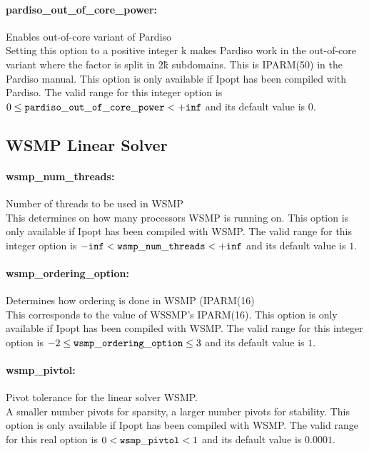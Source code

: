 \paragraph{pardiso\_out\_of\_core\_power:}\label{opt:pardiso_out_of_core_power} Enables out-of-core variant of Pardiso \\
 Setting this option to a positive integer k makes
Pardiso work in the out-of-core variant where the
factor is split in 2\^k subdomains.  This is
IPARM(50) in the Pardiso manual.  This option is
only available if Ipopt has been compiled with
Pardiso. The valid range for this integer option is
$0 \le {\tt pardiso\_out\_of\_core\_power } <  {\tt +inf}$
and its default value is $0$.


\subsection{WSMP Linear Solver}

\paragraph{wsmp\_num\_threads:}\label{opt:wsmp_num_threads} Number of threads to be used in WSMP  \\
 This determines on how many processors WSMP is
running on.  This option is only available if
Ipopt has been compiled with WSMP. The valid range for this integer option is
${\tt -inf} <  {\tt wsmp\_num\_threads } <  {\tt +inf}$
and its default value is $1$.


\paragraph{wsmp\_ordering\_option:}\label{opt:wsmp_ordering_option} Determines how ordering is done in WSMP (IPARM(16)  \\
 This corresponds to the value of WSSMP's
IPARM(16).  This option is only available if
Ipopt has been compiled with WSMP. The valid range for this integer option is
$-2 \le {\tt wsmp\_ordering\_option } \le 3$
and its default value is $1$.


\paragraph{wsmp\_pivtol:}\label{opt:wsmp_pivtol} Pivot tolerance for the linear solver WSMP.  \\
 A smaller number pivots for sparsity, a larger
number pivots for stability.  This option is only
available if Ipopt has been compiled with WSMP. The valid range for this real option is 
$0 <  {\tt wsmp\_pivtol } <  1$
and its default value is $0.0001$.


